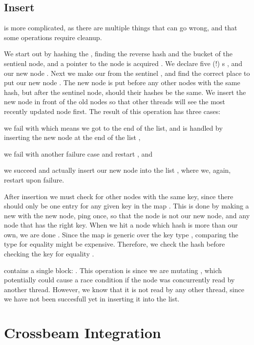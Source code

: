\begin{figure}[ht]

\end{figure}


\filbreak%
\subsection{Insert}
 is more complicated, as there are multiple things that can go wrong, and
that some operations require cleanup.



We start out by hashing the , finding the reverse hash  and the bucket of
the sentienl node, and a pointer to the node is acquired . We declare five (!)
s , and  our new node .
Next we make our  from the sentinel , and find the correct place to put
our new node . The new node is put before any other nodes with the same hash, but
after the sentinel node, should their hashes be the same. We insert the new node in front of the
old nodes so that other threads will see the most recently updated node first. The result of this
operation has three cases:
\begin{enumerate*}[1) ]
  \item we fail with  which means we got to the end of the list, and is handled by
    inserting the new node at the end of the list  ,
  \item we fail with another failure case and restart , and
  \item we succeed and actually insert our new node into the list , where we, again,
    restart upon failure.
\end{enumerate*}

After insertion we must check for other nodes with the same key, since there should only be one
entry for any given key in the map . This is done by making a new  with
the new node, ping once, so that the  node is not our new node, and
 any node that has the right key.  When we hit a node which hash is more than our
own, we are done .  Since the map is generic over the key type , comparing
the type for equality might be expensive. Therefore, we check the hash before checking the key for
equality .

 contains a single  block: . This operation is
 since we are mutating , which potentially could cause a race condition
if the node was concurrently read by another thread. However, we know that it is not read by any
other thread, since we have not been succesfull yet in inserting it into the list.




\section{Crossbeam Integration}
\blindtext{}
